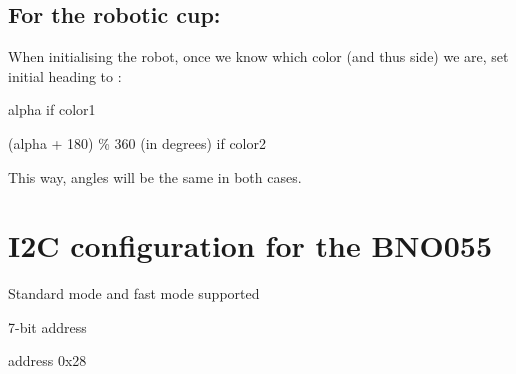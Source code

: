 \subsection*{For the robotic cup\+:}

When initialising the robot, once we know which color (and thus side) we are, set initial heading to \+:
\begin{DoxyItemize}
\item alpha if color1
\item (alpha + 180) \% 360 (in degrees) if color2
\end{DoxyItemize}

This way, angles will be the same in both cases.

\section*{I2C configuration for the B\+N\+O055}


\begin{DoxyItemize}
\item Standard mode and fast mode supported
\item 7-\/bit address
\item address 0x28 
\end{DoxyItemize}
